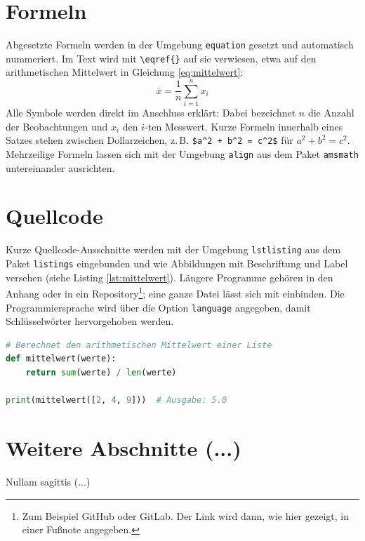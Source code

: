 \section{Formeln}

Abgesetzte Formeln werden in der Umgebung \verb|equation| gesetzt und automatisch nummeriert. Im Text wird mit \verb|\eqref{}| auf sie verwiesen, etwa auf den arithmetischen Mittelwert in Gleichung \eqref{eq:mittelwert}:
\begin{equation}
	\bar{x} = \frac{1}{n} \sum_{i=1}^{n} x_i
	\label{eq:mittelwert}
\end{equation}
Alle Symbole werden direkt im Anschluss erklärt: Dabei bezeichnet $n$ die Anzahl der Beobachtungen und $x_i$ den $i$-ten Messwert. Kurze Formeln innerhalb eines Satzes stehen zwischen Dollarzeichen, z.\,B. \verb|$a^2 + b^2 = c^2$| für $a^2 + b^2 = c^2$. Mehrzeilige Formeln lassen sich mit der Umgebung \verb|align| aus dem Paket \texttt{amsmath} untereinander ausrichten.

\section{Quellcode}

Kurze Quellcode-Ausschnitte werden mit der Umgebung \verb|lstlisting| aus dem Paket \texttt{listings} eingebunden und wie Abbildungen mit Beschriftung und Label versehen (siehe Listing \ref{lst:mittelwert}). Längere Programme gehören in den Anhang oder in ein Repository\footnote{Zum Beispiel GitHub oder GitLab. Der Link wird dann, wie hier gezeigt, in einer Fußnote angegeben.}; eine ganze Datei lässt sich mit \verb|| einbinden. Die Programmiersprache wird über die Option \verb|language| angegeben, damit Schlüsselwörter hervorgehoben werden.

\begin{lstlisting}[language=Python, caption={Berechnung des arithmetischen Mittelwerts}, label={lst:mittelwert}]
# Berechnet den arithmetischen Mittelwert einer Liste
def mittelwert(werte):
    return sum(werte) / len(werte)

print(mittelwert([2, 4, 9]))  # Ausgabe: 5.0
\end{lstlisting}

\section{Weitere Abschnitte (...)}

Nullam sagittis (...) 